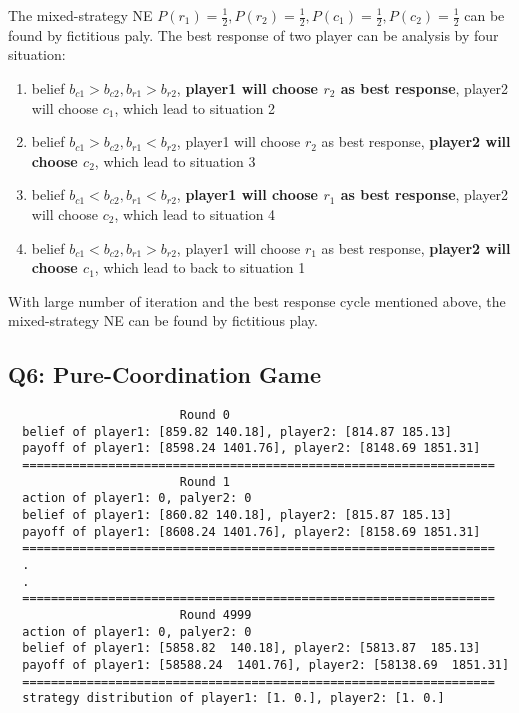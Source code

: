 \documentclass[a4paper, oneside, final, 12pt]{scrartcl} %
\begin{document}
\begingroup
\raggedright
The mixed-strategy NE $P(r_1) = \frac{1}{2}, P(r_2) = \frac{1}{2}, 
P(c_1) = \frac{1}{2}, P(c_2) = \frac{1}{2}$ can be found by fictitious paly.
The best response of two player can be analysis by four situation:

\newpage

\begin{enumerate}
  \item belief $b_{c1} > b_{c2}, b_{r1} > b_{r2}$, 
  \textbf{player1 will choose $r_2$ as best response}, player2 will choose $c_1$, 
  which lead to situation 2
  \item belief $b_{c1} > b_{c2}, b_{r1} < b_{r2}$,
  player1 will choose $r_2$ as best response, \textbf{player2 will choose $c_2$}, 
  which lead to situation 3
  \item belief $b_{c1} < b_{c2}, b_{r1} < b_{r2}$,
  \textbf{player1 will choose $r_1$ as best response}, player2 will choose $c_2$, 
  which lead to situation 4
  \item belief $b_{c1} < b_{c2}, b_{r1} > b_{r2}$,
  player1 will choose $r_1$ as best response, \textbf{player2 will choose $c_1$}, 
  which lead to back to situation 1
\end{enumerate}
With large number of iteration and the best response cycle mentioned above, 
the mixed-strategy NE can be found by fictitious play.
\endgroup

\subsection{Q6: Pure-Coordination Game}

\begin{lstlisting}
                        Round 0
  belief of player1: [859.82 140.18], player2: [814.87 185.13]
  payoff of player1: [8598.24 1401.76], player2: [8148.69 1851.31]
  ==================================================================
                        Round 1
  action of player1: 0, palyer2: 0
  belief of player1: [860.82 140.18], player2: [815.87 185.13]
  payoff of player1: [8608.24 1401.76], player2: [8158.69 1851.31]
  ==================================================================
  .
  .
  ==================================================================
                        Round 4999
  action of player1: 0, palyer2: 0
  belief of player1: [5858.82  140.18], player2: [5813.87  185.13]
  payoff of player1: [58588.24  1401.76], player2: [58138.69  1851.31]
  ==================================================================
  strategy distribution of player1: [1. 0.], player2: [1. 0.]
\end{lstlisting}
\end{document}
